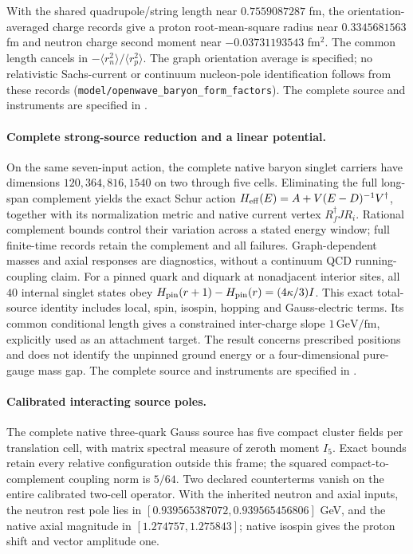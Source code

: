 With the shared quadrupole/string length near $0.7559087287$ fm, the
orientation-averaged charge records give a proton root-mean-square radius
near $0.3345681563$ fm and neutron charge second moment near
$-0.03731193543$ fm$^2$. The common length cancels in
$-\langle r_n^2\rangle/\langle r_p^2\rangle$. The graph orientation average is
specified; no relativistic Sachs-current or continuum nucleon-pole
identification follows from these records
(\texttt{model/openwave\_baryon\_form\_factors}).
The complete source and instruments are specified in .

\paragraph{Complete strong-source reduction and a linear potential.}
On the same seven-input action, the complete native baryon singlet carriers
have dimensions $120,364,816,1540$ on two through five cells. Eliminating the
full long-span complement yields the exact Schur action
$H_{\rm eff}(E)=A+V(E-D)^{-1}V^\dagger$, together with its normalization
metric and native current vertex $R_f^\dagger J R_i$.
Rational complement bounds control their variation across a stated energy
window; full finite-time records retain the complement and all failures.
Graph-dependent masses and axial responses are diagnostics, without a
continuum QCD running-coupling claim.
For a pinned quark and diquark at nonadjacent interior sites, all $40$
internal singlet states obey
$H_{\rm pin}(r+1)-H_{\rm pin}(r)=(4\kappa/3)I$.
This exact total-source identity includes local, spin, isospin, hopping and
Gauss-electric terms. Its common conditional length gives a constrained
inter-charge slope $1\,\mathrm{GeV/fm}$, explicitly used as an attachment
target. The result concerns prescribed positions and does not identify the
unpinned ground energy or a four-dimensional pure-gauge mass gap.
The complete source and instruments are specified in .

\paragraph{Calibrated interacting source poles.}
The complete native three-quark Gauss source has five compact cluster
fields per translation cell, with matrix spectral measure of zeroth moment
$I_5$. Exact bounds retain every relative configuration outside this frame;
the squared compact-to-complement coupling norm is $5/64$.
Two declared counterterms vanish on the entire calibrated two-cell
operator. With the inherited neutron and axial inputs, the neutron rest
pole lies in $[0.939565387072,0.939565456806]$ GeV, and the native axial
magnitude in $[1.274757,1.275843]$; native isospin gives the proton shift
and vector amplitude one.

